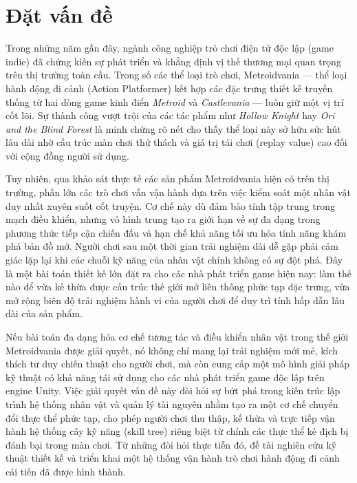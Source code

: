 \documentclass[../DoAn.tex]{subfiles}
\begin{document}
\section{Đặt vấn đề}
\label{section:1.1}

Trong những năm gần đây, ngành công nghiệp trò chơi điện tử độc lập (game indie) đã chứng kiến sự phát triển và khẳng định vị thế thương mại quan trọng trên thị trường toàn cầu. Trong số các thể loại trò chơi, Metroidvania — thể loại hành động đi cảnh (Action Platformer) kết hợp các đặc trưng thiết kế truyền thống từ hai dòng game kinh điển \textit{Metroid} và \textit{Castlevania} — luôn giữ một vị trí cốt lõi. Sự thành công vượt trội của các tác phẩm như \textit{Hollow Knight} \cite{hollowknightgame} hay \textit{Ori and the Blind Forest} là minh chứng rõ nét cho thấy thể loại này sở hữu sức hút lâu dài nhờ cấu trúc màn chơi thử thách và giá trị tái chơi (replay value) cao đối với cộng đồng người sử dụng.

Tuy nhiên, qua khảo sát thực tế các sản phẩm Metroidvania hiện có trên thị trường, phần lớn các trò chơi vẫn vận hành dựa trên việc kiểm soát một nhân vật duy nhất xuyên suốt cốt truyện. Cơ chế này dù đảm bảo tính tập trung trong mạch điều khiển, nhưng vô hình trung tạo ra giới hạn về sự đa dạng trong phương thức tiếp cận chiến đấu và hạn chế khả năng tối ưu hóa tính năng khám phá bản đồ mở. Người chơi sau một thời gian trải nghiệm dài dễ gặp phải cảm giác lặp lại khi các chuỗi kỹ năng của nhân vật chính không có sự đột phá. Đây là một bài toán thiết kế lớn đặt ra cho các nhà phát triển game hiện nay: làm thế nào để vừa kế thừa được cấu trúc thế giới mở liên thông phức tạp đặc trưng, vừa mở rộng biên độ trải nghiệm hành vi của người chơi để duy trì tính hấp dẫn lâu dài của sản phẩm.

Nếu bài toán đa dạng hóa cơ chế tương tác và điều khiển nhân vật trong thế giới Metroidvania được giải quyết, nó không chỉ mang lại trải nghiệm mới mẻ, kích thích tư duy chiến thuật cho người chơi, mà còn cung cấp một mô hình giải pháp kỹ thuật có khả năng tái sử dụng cho các nhà phát triển game độc lập trên engine Unity. Việc giải quyết vấn đề này đòi hỏi sự bứt phá trong kiến trúc lập trình hệ thống nhân vật và quản lý tài nguyên nhằm tạo ra một cơ chế chuyển đổi thực thể phức tạp, cho phép người chơi thu thập, kế thừa và trực tiếp vận hành hệ thống cây kỹ năng (skill tree) riêng biệt từ chính các thực thể kẻ địch bị đánh bại trong màn chơi. Từ những đòi hỏi thực tiễn đó, đề tài nghiên cứu kỹ thuật thiết kế và triển khai một hệ thống vận hành trò chơi hành động đi cảnh cải tiến đã được hình thành.
\end{document}
